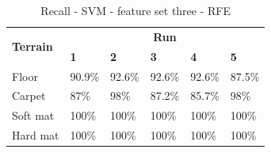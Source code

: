 \documentclass[USenglish]{ifimaster}  %
\begin{document}
	\begin{table}[h]\ContinuedFloat
	\begin{subtable}[h]{1\textwidth}
		\centering
		\captionsetup{justification=centering}
		\begin{tabular}{@{}llllll@{}}
			\toprule
			\multirow{2}{*}{\textbf{Terrain}} & \multicolumn{5}{c}{\textbf{Run}} \\ \cmidrule(l){2-6} 
			& \multicolumn{1}{l|}{\textbf{1}} & \multicolumn{1}{l|}{\textbf{2}} & \multicolumn{1}{l|}{\textbf{3}} & \multicolumn{1}{l|}{\textbf{4}} & \textbf{5} \\ \midrule
			\multicolumn{1}{l|}{Floor} & \multicolumn{1}{l|}{90.9\%} & \multicolumn{1}{l|}{92.6\%} & \multicolumn{1}{l|}{92.6\%} & \multicolumn{1}{l|}{92.6\%} & 87.5\% \\ \midrule
			\multicolumn{1}{l|}{Carpet} & \multicolumn{1}{l|}{87\%} & \multicolumn{1}{l|}{98\%} & \multicolumn{1}{l|}{87.2\%} & \multicolumn{1}{l|}{85.7\%} & 98\% \\ \midrule
			\multicolumn{1}{l|}{Soft mat} & \multicolumn{1}{l|}{100\%} & \multicolumn{1}{l|}{100\%} & \multicolumn{1}{l|}{100\%} & \multicolumn{1}{l|}{100\%} & 100\% \\ \midrule
			\multicolumn{1}{l|}{Hard mat} & \multicolumn{1}{l|}{100\%} & \multicolumn{1}{l|}{100\%} & \multicolumn{1}{l|}{100\%} & \multicolumn{1}{l|}{100\%} & 100\% \\ \bottomrule
		\end{tabular}
		\caption{Recall - SVM - feature set three - RFE}
		\label{recallsvm}
	\end{subtable}
\end{table}
\end{document}
